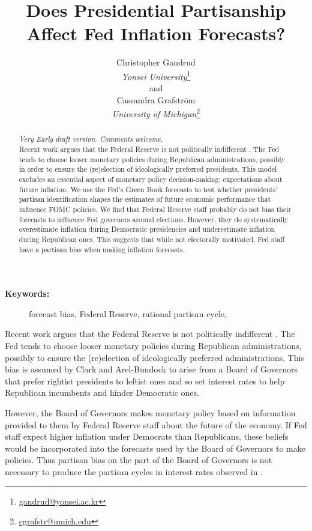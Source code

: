 \documentclass[a4paper]{article}\usepackage{graphicx, color}
\title{Does Presidential Partisanship Affect Fed Inflation Forecasts?}
\author{Christopher Gandrud \\
                {\emph{Yonsei University}}\footnote{\href{mailto:gandrud@yonsei.ac.kr}{gandrud@yonsei.ac.kr}} \\
                and \\
            Cassandra Grafstr\"{o}m \\
                {\emph{University of Michigan}}\footnote{\href{mailto:cgrafstr@umich.edu}{cgrafstr@umich.edu}}}
\begin{document}
\maketitle

\begin{abstract}
\noindent\emph{Very Early draft version. Comments welcome.} \\[0.2cm]
Recent work argues that the Federal Reserve is not politically indifferent \citep{Clark2011}. The Fed tends to choose looser monetary policies during Republican administrations, possibly in order to ensure the (re)election of ideologically preferred presidents. This model excludes an essential aspect of monetary policy decision-making: expectations about future inflation. We use the Fed's Green Book forecasts to test whether presidents' partisan identification shapes the estimates of future economic performance that influence FOMC policies. We find that Federal Reserve staff probably do not bias their forecasts to influence Fed governors around elections. However, they do systematically overestimate inflation during Democratic presidencies and underestimate inflation during Republican ones. This suggests that while not electorally motivated, Fed staff have a partisan bias when making inflation forecasts.

\end{abstract}

\begin{description}
  \item [{\textbf{Keywords:}}] forecast bias, Federal Reserve, rational partisan cycle,
\end{description}

\vspace{0.3cm}

Recent work argues that the Federal Reserve is not politically indifferent \cite{Clark2011}. The Fed tends to choose looser monetary policies during Republican administrations, possibly to ensure the (re)election of ideologically preferred administrations. This bias is assumed by Clark and Arel-Bundock to arise from a Board of Governors that prefer rightist presidents to leftist ones and so set interest rates to help Republican incumbents and hinder Democratic ones. 

However, the Board of Governors makes monetary policy based on information provided to them by Federal Reserve staff about the future of the economy. If Fed staff expect higher inflation under Democrats than Republicans, these beliefs would be incorporated into the forecasts used by the Board of Governors to make policies. Thus partisan bias on the part of the Board of Governors is not necessary to produce the partisan cycles in interest rates observed in \cite{Clark2011}. 
\end{document}
